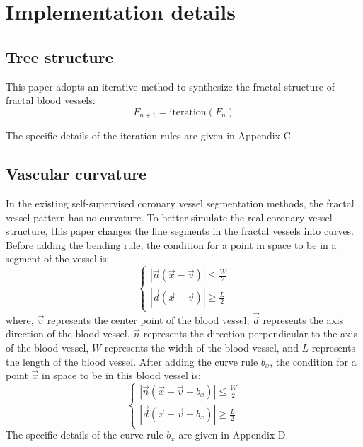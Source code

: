 \section{Implementation details}


\subsection{Tree structure}
This paper adopts an iterative method to synthesize the fractal structure of fractal blood vessels:
\begin{equation}
F_{n+1} = \text{iteration}(F_n)
\end{equation}

The specific details of the iteration rules are given in Appendix C.


\subsection{Vascular curvature}
In the existing self-supervised coronary vessel segmentation methods, the fractal vessel pattern has no curvature. To better simulate the real coronary vessel structure, this paper changes the line segments in the fractal vessels into curves. Before adding the bending rule, the condition for a point in space to be in a segment of the vessel is:
\begin{equation}
\begin{cases}
|\vec{n}(\vec{x} - \vec{v})| \leq \frac{W}{2} \\
|\vec{d}(\vec{x} - \vec{v})| \geq \frac{L}{2}
\end{cases}
\end{equation}
where, $\vec{v}$ represents the center point of the blood vessel, $\vec{d}$ represents the axis direction of the blood vessel, $\vec{n}$ represents the direction perpendicular to the axis of the blood vessel, $W$ represents the width of the blood vessel, and $L$ represents the length of the blood vessel. After adding the curve rule $b_x$, the condition for a point $\vec{x}$ in space to be in this blood vessel is:
\begin{equation}
\begin{cases}
|\vec{n}(\vec{x} - \vec{v} + b_x)| \leq \frac{W}{2} \\
|\vec{d}(\vec{x} - \vec{v} + b_x)| \geq \frac{L}{2}
\end{cases}
\end{equation}
The specific details of the curve rule $b_x$ are given in Appendix D.